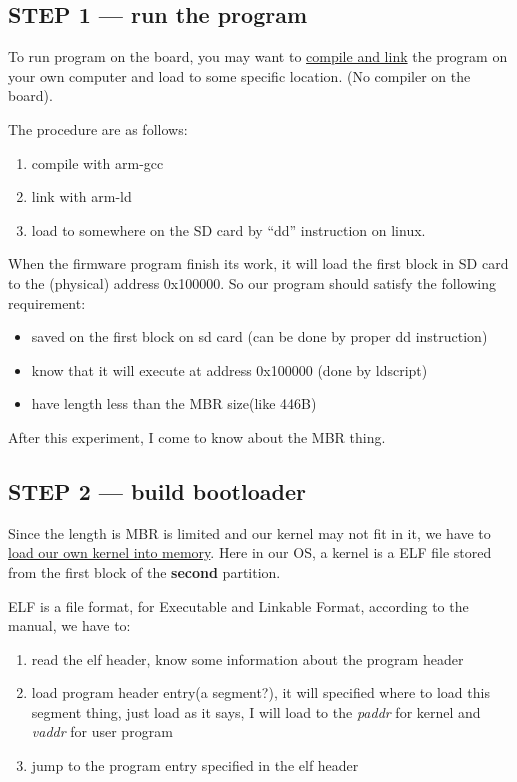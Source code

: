 \documentclass[12pt]{article}
\begin{document}
\subsection{STEP 1 --- run the program}

To run program on the board, you may want to \underline{compile and link} the program on your own computer and load to some specific location. (No compiler on the board).

The procedure are as follows:

\begin{enumerate}
	\item	compile with arm-gcc
	\item	link with arm-ld
	\item	load to somewhere on the SD card by ``dd'' instruction on linux.
\end{enumerate}

When the firmware program finish its work, it will load the first block in SD card to the (physical) address 0x100000. So our program should satisfy the following requirement:

\begin{itemize}
	\item	saved on the first block on sd card (can be done by proper dd instruction)
	\item	know that it will execute at address 0x100000 (done by ldscript)
	\item have length less than the MBR size(like 446B)
\end{itemize}

After this experiment, I come to know about the MBR thing.

\subsection{STEP 2 --- build bootloader}

Since the length is MBR is limited and our kernel may not fit in it, we have to \underline{load our own kernel into memory}. Here in our OS, a kernel is a ELF file stored from the first block of the \textbf{second} partition.

ELF is a file format, for Executable and Linkable Format, according to the manual, we have to:
\begin{enumerate}
	\item	read the elf header, know some information about the program header
	\item	load program header entry(a segment?), it will specified where to load this segment thing, just load as it says, I will load to the \emph{paddr} for kernel and \emph{vaddr} for user program
	\item	jump to the program entry specified in the elf header
\end{enumerate}
\end{document}
